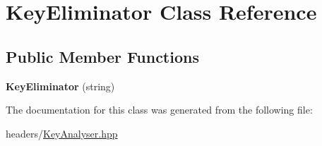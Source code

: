 \hypertarget{classKeyEliminator}{}\section{Key\+Eliminator Class Reference}
\label{classKeyEliminator}
\subsection*{Public Member Functions}
\begin{DoxyCompactItemize}
\item 
\mbox{\label{classKeyEliminator_a19de2303e7fd8d1c1e4f1cddd05abdcb}} 
{\bfseries Key\+Eliminator} (string)
\end{DoxyCompactItemize}


The documentation for this class was generated from the following file\+:\begin{DoxyCompactItemize}
\item 
headers/\hyperlink{KeyAnalyser_8hpp}{Key\+Analyser.\+hpp}\end{DoxyCompactItemize}
